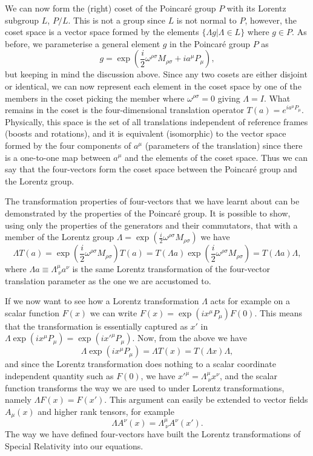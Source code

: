 \documentclass[notes.tex]{subfiles}
\begin{document}
We can now form the (right) coset of the Poincaré group $P$ with its Lorentz subgroup $L$, $P/L$. This is not a group since $L$ is not normal to $P$, however, the coset space is a vector space formed by the elements $\{ \Lambda g | \Lambda \in L\}$ where $g\in P$. As before, we parameterise a general element $g$ in the Poincaré group $P$ as
\begin{equation*}
g=\exp\left(\frac{i}{2}\omega^{\rho \sigma}M_{\rho \sigma}+ia^\mu P_\mu\right),
\end{equation*}
but keeping in mind the discussion above. Since any two cosets are either disjoint or identical, we can now represent each element in the coset space by one of the members in the coset picking the member where $\omega^{\rho \sigma}=0$ giving $\Lambda=I$. What remains in the coset is the four-dimensional translation operator $T(a)=e^{ia^\mu P_\mu}$.  Physically, this space is the set of all translations independent of reference frames (boosts and rotations), and it is equivalent (isomorphic) to the vector space formed by the four components of $a^\mu$ (parameters of the translation) since there is a one-to-one map between $a^\mu$  and the elements of the coset space. Thus we can say that the four-vectors form the coset space between the Poincaré group and the Lorentz group.

The transformation properties of four-vectors that we have learnt about can be demonstrated by the properties of the Poincaré group. It is possible to show, using only the properties of the generators and their commutators,  that with a member of the Lorentz group $\Lambda=\exp(\frac{i}{2}\omega^{\rho \sigma}M_{\rho \sigma})$ we have
\[ \Lambda T(a) = \exp\left(\frac{i}{2}\omega^{\rho \sigma}M_{\rho \sigma}\right)T(a)=T(\Lambda a) \exp\left(\frac{i}{2}\omega^{\rho \sigma}M_{\rho \sigma}\right) =T(\Lambda a) \Lambda, \]
where $\Lambda a \equiv \Lambda^\mu_{~\nu} a^\nu$ is the same Lorentz transformation of the four-vector translation parameter as the one we are accustomed to.

If we now want to see how a Lorentz transformation $\Lambda$ acts for example on a scalar function $F(x)$  we can write $F(x)=\exp(ix^\mu P_\mu)F(0)$. This means that the transformation is essentially captured as $x'$ in $\Lambda\exp(ix^\mu P_\mu)= \exp(ix'^\mu P_\mu)$. Now, from the above we have
\[ \Lambda\exp(ix^\mu P_\mu)=\Lambda T(x)=T(\Lambda x) \Lambda, \]
and since the Lorentz transformation does nothing to a scalar coordinate independent quantity such as $F(0)$, we have $x'^\mu=\Lambda^\mu_{~\nu} x^\nu$, and the scalar function transforms the way we are used to under Lorentz transformations, namely $\Lambda F(x)= F(x')$. This argument can easily be extended to vector fields $A_\mu(x)$ and higher rank tensors, for example
\[ \Lambda A^\nu(x)= \Lambda^\mu_{~\nu} A^\nu(x'). \]
 The way we have defined four-vectors have built the Lorentz transformations of Special Relativity into our equations.
\end{document}

